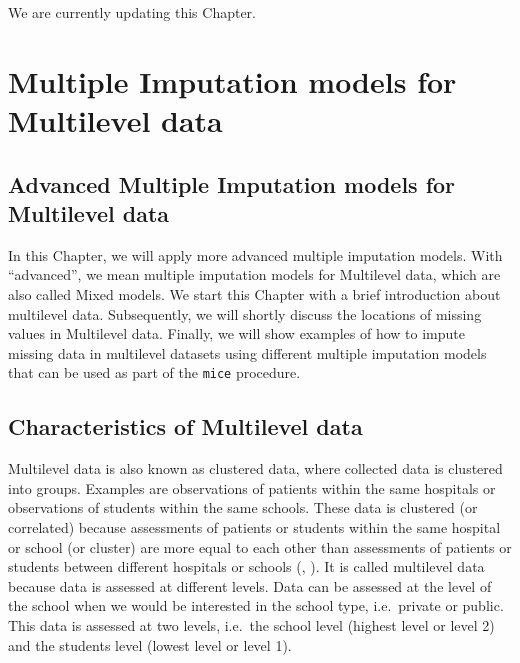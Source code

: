 \documentclass[
]{book}
\begin{document}
We are currently updating this Chapter.

\hypertarget{multiple-imputation-models-for-multilevel-data}{%
\chapter{Multiple Imputation models for Multilevel data}\label{multiple-imputation-models-for-multilevel-data}}

\hypertarget{advanced-multiple-imputation-models-for-multilevel-data}{%
\section{Advanced Multiple Imputation models for Multilevel data}\label{advanced-multiple-imputation-models-for-multilevel-data}}

In this Chapter, we will apply more advanced multiple imputation models. With ``advanced'', we mean multiple imputation models for Multilevel data, which are also called Mixed models. We start this Chapter with a brief introduction about multilevel data. Subsequently, we will shortly discuss the locations of missing values in Multilevel data. Finally, we will show examples of how to impute missing data in multilevel datasets using different multiple imputation models that can be used as part of the \texttt{mice} procedure.

\hypertarget{characteristics-of-multilevel-data}{%
\section{Characteristics of Multilevel data}\label{characteristics-of-multilevel-data}}

Multilevel data is also known as clustered data, where collected data is clustered into groups. Examples are observations of patients within the same hospitals or observations of students within the same schools. These data is clustered (or correlated) because assessments of patients or students within the same hospital or school (or cluster) are more equal to each other than assessments of patients or students between different hospitals or schools (\citet{twisk2006appliedmultilevelanalysis}, \citet{hox2018multilevelanalysis}). It is called multilevel data because data is assessed at different levels. Data can be assessed at the level of the school when we would be interested in the school type, i.e.~private or public. This data is assessed at two levels, i.e.~the school level (highest level or level 2) and the students level (lowest level or level 1).
\end{document}
